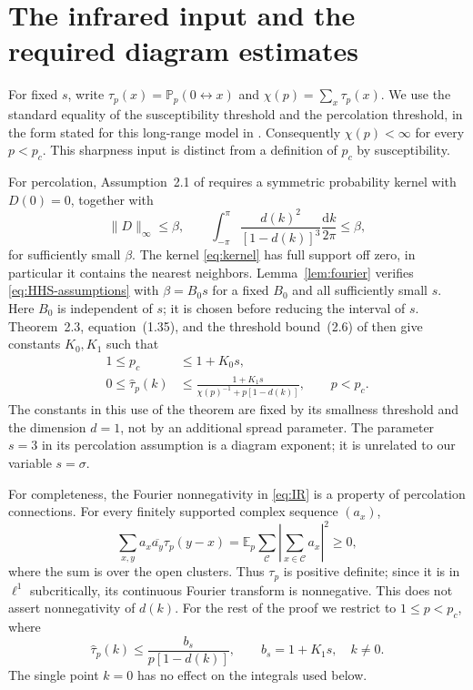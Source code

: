 \documentclass[11pt]{article}
\theoremstyle{definition}
\newcommand{\Pp}{\mathbb P_p}
\newcommand{\Ep}{\mathbb E_p}
\newcommand{\intk}{\int_{-\pi}^{\pi}}
\newcommand{\dm}{\frac{\mathrm dk}{2\pi}}
\begin{document}
\section{The infrared input and the required diagram estimates}
\label{sec:diagrams}

For fixed $s$, write
$\tau_p(x)=\Pp(0\leftrightarrow x)$ and
$\chi(p)=\sum_x\tau_p(x)$. We use the standard equality of the
susceptibility threshold and the percolation threshold, in the form stated
for this long-range model in \cite[Section~1.2.5]{HHS2008}. Consequently
$\chi(p)<\infty$ for every $p<p_c$. This sharpness input is distinct
from a definition of $p_c$ by susceptibility.

For percolation, Assumption~2.1 of \cite{HHS2008} requires a symmetric
probability kernel with $D(0)=0$, together with
\begin{equation}\label{eq:HHS-assumptions}
 \|D\|_\infty\le\beta,\qquad
 \intk\frac{d(k)^2}{[1-d(k)]^3}\dm\le\beta,
\end{equation}
for sufficiently small $\beta$. The kernel \eqref{eq:kernel} has full
support off zero, in particular it contains the nearest neighbors.
Lemma~\ref{lem:fourier} verifies \eqref{eq:HHS-assumptions} with
$\beta=B_0s$ for a fixed $B_0$ and all sufficiently small $s$.
Here $B_0$ is independent of $s$; it is chosen before reducing the interval
of $s$. Theorem~2.3, equation~(1.35), and the threshold bound~(2.6) of
\cite{HHS2008} then give constants $K_0,K_1$ such that
\begin{align}
 1\le p_c&\le1+K_0s,\label{eq:coarse-pc}\\
 0\le\widehat\tau_p(k)&\le
 \frac{1+K_1s}{\chi(p)^{-1}+p[1-d(k)]},\qquad p<p_c.
 \label{eq:IR}
\end{align}
The constants in this use of the theorem are fixed by its smallness
threshold and the dimension $d=1$, not by an additional spread parameter.
The parameter $s=3$ in its percolation assumption is a diagram exponent;
it is unrelated to our variable $s=\sigma$.

For completeness, the Fourier nonnegativity in \eqref{eq:IR} is a
property of percolation connections. For every finitely supported complex
sequence $(a_x)$,
\[
 \sum_{x,y}a_x\overline{a_y}\tau_p(y-x)
 =\Ep\sum_{\mathcal C}
       \left|\sum_{x\in\mathcal C}a_x\right|^2\ge0,
\]
where the sum is over the open clusters. Thus $\tau_p$ is positive
definite; since it is in $\ell^1$ subcritically, its continuous Fourier
transform is nonnegative. This does not assert nonnegativity of $d(k)$.
For the rest of the proof we restrict to $1\le p<p_c$, where
\begin{equation}\label{eq:IR-simplified}
 \widehat\tau_p(k)\le\frac{b_s}{p[1-d(k)]},\qquad b_s=1+K_1s,
 \quad k\ne0.
\end{equation}
The single point $k=0$ has no effect on the integrals used below.
\end{document}
